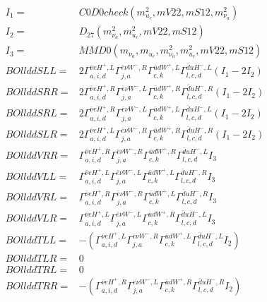 \documentclass[A4,landscape]{article}
\begin{document}
\begin{align} 
I_1 = & C0D0check(m^2_{u_{{c}}}, mV22, mS12, m^2_{\nu_{{a}}}) \\ 
I_2 = & D_{27}(m^2_{\nu_{{a}}}, m^2_{u_{{c}}}, mV22, mS12) \\ 
I_3 = & MMD0(m_{\nu_{{a}}}, m_{u_{{c}}}, m^2_{\nu_{{a}}}, m^2_{u_{{c}}}, mV22, mS12) \\ 
  BOllddSLL= & 2  \Gamma^{\bar{\nu}e H^+,L}_{a, i, d} \Gamma^{\bar{e}\nu W^- ,R}_{j, a} \Gamma^{\bar{u}d W^+,L}_{c, k} \Gamma^{\bar{d}u H^- ,L}_{l, c, d} (I_1 - 2 I_2) \\ 
  BOllddSRR= & 2  \Gamma^{\bar{\nu}e H^+,R}_{a, i, d} \Gamma^{\bar{e}\nu W^- ,L}_{j, a} \Gamma^{\bar{u}d W^+,R}_{c, k} \Gamma^{\bar{d}u H^- ,R}_{l, c, d} (I_1 - 2 I_2) \\ 
  BOllddSRL= & 2  \Gamma^{\bar{\nu}e H^+,R}_{a, i, d} \Gamma^{\bar{e}\nu W^- ,L}_{j, a} \Gamma^{\bar{u}d W^+,L}_{c, k} \Gamma^{\bar{d}u H^- ,L}_{l, c, d} (I_1 - 2 I_2) \\ 
  BOllddSLR= & 2  \Gamma^{\bar{\nu}e H^+,L}_{a, i, d} \Gamma^{\bar{e}\nu W^- ,R}_{j, a} \Gamma^{\bar{u}d W^+,R}_{c, k} \Gamma^{\bar{d}u H^- ,R}_{l, c, d} (I_1 - 2 I_2) \\ 
  BOllddVRR= &  \Gamma^{\bar{\nu}e H^+,R}_{a, i, d} \Gamma^{\bar{e}\nu W^- ,R}_{j, a} \Gamma^{\bar{u}d W^+,R}_{c, k} \Gamma^{\bar{d}u H^- ,L}_{l, c, d} I_3 \\ 
  BOllddVLL= &  \Gamma^{\bar{\nu}e H^+,L}_{a, i, d} \Gamma^{\bar{e}\nu W^- ,L}_{j, a} \Gamma^{\bar{u}d W^+,L}_{c, k} \Gamma^{\bar{d}u H^- ,R}_{l, c, d} I_3 \\ 
  BOllddVRL= &  \Gamma^{\bar{\nu}e H^+,R}_{a, i, d} \Gamma^{\bar{e}\nu W^- ,R}_{j, a} \Gamma^{\bar{u}d W^+,L}_{c, k} \Gamma^{\bar{d}u H^- ,R}_{l, c, d} I_3 \\ 
  BOllddVLR= &  \Gamma^{\bar{\nu}e H^+,L}_{a, i, d} \Gamma^{\bar{e}\nu W^- ,L}_{j, a} \Gamma^{\bar{u}d W^+,R}_{c, k} \Gamma^{\bar{d}u H^- ,L}_{l, c, d} I_3 \\ 
  BOllddTLL= & -( \Gamma^{\bar{\nu}e H^+,L}_{a, i, d} \Gamma^{\bar{e}\nu W^- ,R}_{j, a} \Gamma^{\bar{u}d W^+,L}_{c, k} \Gamma^{\bar{d}u H^- ,L}_{l, c, d} I_2) \\ 
  BOllddTLR= & 0 \\ 
  BOllddTRL= & 0 \\ 
  BOllddTRR= & -( \Gamma^{\bar{\nu}e H^+,R}_{a, i, d} \Gamma^{\bar{e}\nu W^- ,L}_{j, a} \Gamma^{\bar{u}d W^+,R}_{c, k} \Gamma^{\bar{d}u H^- ,R}_{l, c, d} I_2) \\ 
\end{align} 
\end{document}
